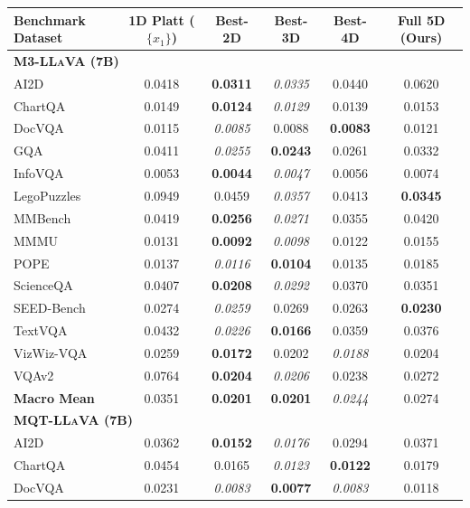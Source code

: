 \begin{table}[t]
\setlength{\tabcolsep}{4pt}
\renewcommand{\arraystretch}{1.05}
\centering
\scriptsize
\begin{tabular}{lccccc}
\toprule
\textbf{Benchmark Dataset} & \textbf{1D Platt ($\{x_1\}$)} & \textbf{Best-2D} & \textbf{Best-3D} & \textbf{Best-4D} & \textbf{Full 5D (Ours)} \\
\midrule
\multicolumn{6}{l}{\textsc{\textbf{M3-LLaVA (7B)}}} \\
\midrule
AI2D & 0.0418 & \textbf{0.0311} & \textit{0.0335} & 0.0440 & 0.0620 \\
ChartQA & 0.0149 & \textbf{0.0124} & \textit{0.0129} & 0.0139 & 0.0153 \\
DocVQA & 0.0115 & \textit{0.0085} & 0.0088 & \textbf{0.0083} & 0.0121 \\
GQA & 0.0411 & \textit{0.0255} & \textbf{0.0243} & 0.0261 & 0.0332 \\
InfoVQA & 0.0053 & \textbf{0.0044} & \textit{0.0047} & 0.0056 & 0.0074 \\
LegoPuzzles & 0.0949 & 0.0459 & \textit{0.0357} & 0.0413 & \textbf{0.0345} \\
MMBench & 0.0419 & \textbf{0.0256} & \textit{0.0271} & 0.0355 & 0.0420 \\
MMMU & 0.0131 & \textbf{0.0092} & \textit{0.0098} & 0.0122 & 0.0155 \\
POPE & 0.0137 & \textit{0.0116} & \textbf{0.0104} & 0.0135 & 0.0185 \\
ScienceQA & 0.0407 & \textbf{0.0208} & \textit{0.0292} & 0.0370 & 0.0351 \\
SEED-Bench & 0.0274 & \textit{0.0259} & 0.0269 & 0.0263 & \textbf{0.0230} \\
TextVQA & 0.0432 & \textit{0.0226} & \textbf{0.0166} & 0.0359 & 0.0376 \\
VizWiz-VQA & 0.0259 & \textbf{0.0172} & 0.0202 & \textit{0.0188} & 0.0204 \\
VQAv2 & 0.0764 & \textbf{0.0204} & \textit{0.0206} & 0.0238 & 0.0272 \\
\midrule
\textbf{Macro Mean} & 0.0351 & \textbf{0.0201} & \textbf{0.0201} & \textit{0.0244} & 0.0274 \\
\midrule
\multicolumn{6}{l}{\textsc{\textbf{MQT-LLaVA (7B)}}} \\
\midrule
AI2D & 0.0362 & \textbf{0.0152} & \textit{0.0176} & 0.0294 & 0.0371 \\
ChartQA & 0.0454 & 0.0165 & \textit{0.0123} & \textbf{0.0122} & 0.0179 \\
DocVQA & 0.0231 & \textit{0.0083} & \textbf{0.0077} & \textit{0.0083} & 0.0118 \\

\end{tabular}
\end{table}
